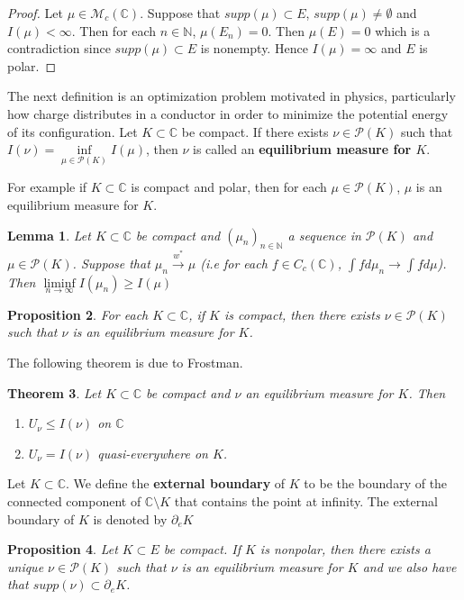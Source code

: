 \documentclass{amsart}
\newtheorem{thm}{Theorem}[section]
\newtheorem{lem}[thm]{Lemma}
\newtheorem{prop}[thm]{Proposition}
\newcommand{\N}{\mathbb{N}}
\newcommand{\C}{\mathbb{C}}
\newcommand{\MCM}{\mathcal{M}}
\newcommand{\MCP}{\mathcal{P}}
\begin{document}
\begin{proof}
Let $\mu \in \MCM_c(\C)$. Suppose that $supp(\mu) \subset E$, $supp(\mu) \neq \emptyset$ and $I(\mu) < \infty$. Then for each $n \in \N$, $\mu(E_n) = 0$. Then $\mu(E) = 0$ which is a contradiction since $supp(\mu) \subset E$ is nonempty. Hence $I(\mu) = \infty$ and $E$ is polar.
\end{proof}
 
The next definition is an optimization problem motivated in physics, particularly how charge distributes in a conductor in order to minimize the potential energy of its configuration. 
Let $K \subset \C$ be compact. If there exists $\nu \in \MCP(K)$ such that $I(\nu) = \inf\limits_{\mu \in \MCP(K)}I(\mu)$, then $\nu$ is called an \textbf{equilibrium measure for $K$}.

For example if $K \subset \C$ is compact and polar, then for each $\mu \in \MCP(K)$, $\mu$ is an equilibrium measure for $K$.
 
\begin{lem}
Let $K \subset \C$ be compact and $(\mu_n)_{n \in \N}$ a sequence in $\MCP(K)$ and $\mu \in \MCP(K)$. Suppose that $\mu_n \overset{w^*}{\rightarrow} \mu$ (i.e for each $f \in C_c(\C)$, $\int f d\mu_{n} \rightarrow \int f d\mu$). Then $\liminf\limits_{n\rightarrow \infty}I(\mu_n) \geq I(\mu)$ 
\end{lem} 
 
\begin{prop}
For each $K \subset \C$, if $K$ is compact, then there exists $\nu \in \MCP(K)$ such that $\nu$ is an equilibrium measure for $K$.
\end{prop}

The following theorem is due to Frostman. 
 
\begin{thm}
Let $K \subset \C$ be compact and $\nu$ an equilibrium measure for $K$. Then 
\begin{enumerate}
\item $U_{\nu} \leq I(\nu)$ on $\C$
\item $U_{\nu} = I(\nu)$ quasi-everywhere on $K$. 
\end{enumerate}
\end{thm}

Let $K \subset \C$. We define the \textbf{external boundary} of $K$ to be the boundary of the connected component of $\C \setminus K$ that contains the point at infinity. The external boundary of $K$ is denoted by $\partial_eK$

\begin{prop}
Let $K \subset E$ be compact. If $K$ is nonpolar, then there exists a unique $\nu \in \MCP(K)$ such that $\nu$ is an equilibrium measure for $K$ and we also have that $supp(\nu) \subset \partial_eK$. 
\end{prop}
 
\end{document}
